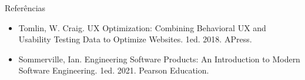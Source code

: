 \documentclass[11pt]{beamer}
\begin{document}
   \begin{frame}{Referências}
      \begin{itemize}
         \item Tomlin, W. Craig. UX Optimization: Combining Behavioral UX and Usability Testing Data to Optimize Websites. 1ed. 2018. APress.
         \item Sommerville, Ian. Engineering Software Products: An Introduction to Modern Software Engineering. 1ed. 2021. Pearson Education.
      \end{itemize}
   \end{frame}  
\end{document}
